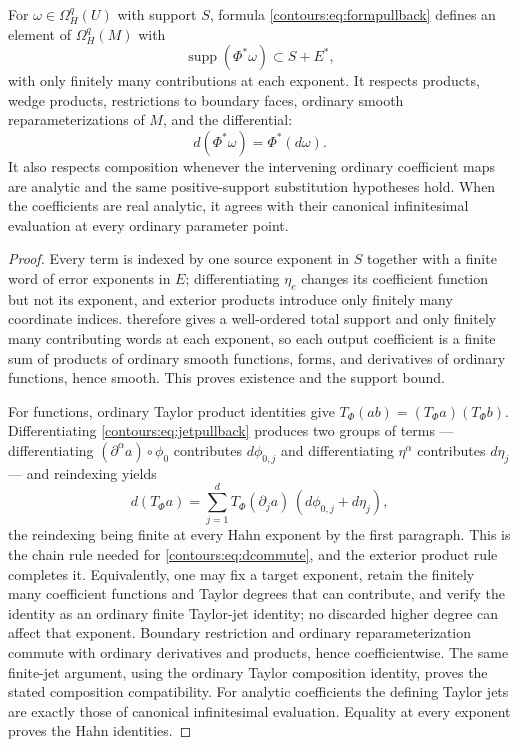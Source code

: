 \documentclass[11pt,letterpaper]{article}
\theoremstyle{definition}
\theoremstyle{remark}
\newcommand{\supp}{\operatorname{supp}}\newcommand{\Res}{\operatorname{Res}}
\numberwithin{equation}{section}
\begin{document}
\begin{lemma}
\label{contours:lem:pullback}
For $\omega\in\Omega_H^q(U)$ with support $S$, formula
\eqref{contours:eq:formpullback} defines an element of $\Omega_H^q(M)$ with
\[
  \supp(\Phi^*\omega)\subset S+E^* ,
\]
with only finitely many contributions at each exponent. It respects products, wedge
products, restrictions to boundary faces, ordinary smooth reparameterizations of
$M$, and the differential:
\begin{equation}\label{contours:eq:dcommute}
  d(\Phi^*\omega)=\Phi^*(d\omega).
\end{equation}
It also respects composition whenever the intervening ordinary coefficient maps are
analytic and the same positive-support substitution hypotheses hold. When the
coefficients are real analytic, it agrees with their canonical infinitesimal
evaluation at every ordinary parameter point.
\end{lemma}
\begin{proof}
Every term is indexed by one source exponent in $S$ together with a finite word of
error exponents in $E$; differentiating $\eta_e$ changes its coefficient function
but not its exponent, and exterior products introduce only finitely many coordinate
indices.  therefore gives a well-ordered total support
and only finitely many contributing words at each exponent, so each output
coefficient is a finite sum of products of ordinary smooth functions, forms, and
derivatives of ordinary functions, hence smooth. This proves existence and the
support bound.

For functions, ordinary Taylor product identities give $T_\Phi(ab)=(T_\Phi a)
(T_\Phi b)$. Differentiating \eqref{contours:eq:jetpullback} produces two groups of
terms --- differentiating $(\partial^\alpha a)\circ\phi_0$ contributes $d\phi_{0,j}$
and differentiating $\eta^\alpha$ contributes $d\eta_j$ --- and reindexing yields
\[
  d(T_\Phi a)=\sum_{j=1}^dT_\Phi(\partial_ja)\,(d\phi_{0,j}+d\eta_j),
\]
the reindexing being finite at every Hahn exponent by the first paragraph. This is
the chain rule needed for \eqref{contours:eq:dcommute}, and the exterior product
rule completes it. Equivalently, one may fix a target exponent, retain the finitely
many coefficient functions and Taylor degrees that can contribute, and verify the
identity as an ordinary finite Taylor-jet identity; no discarded higher degree can
affect that exponent. Boundary restriction and ordinary reparameterization commute
with ordinary derivatives and products, hence coefficientwise. The same finite-jet
argument, using the ordinary Taylor composition identity, proves the stated
composition compatibility. For analytic coefficients the defining Taylor jets
are exactly those of canonical infinitesimal evaluation. Equality at every
exponent proves the Hahn identities.
\end{proof}
\end{document}
